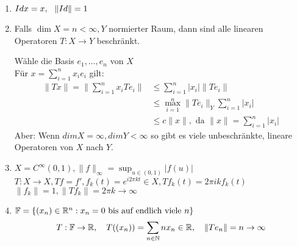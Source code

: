 \begin{beispiel}
	\begin{enumerate}[label=\alph*\upshape)]
		\item $Id x = x, \hspace{0.25cm} \|  Id \| = 1$
		\item Falls $\dim X = n < \infty, Y$ normierter Raum, dann sind alle linearen Operatoren $T: X \rightarrow Y$ beschränkt.
		\begin{beweis}
			Wähle die Basis $e_{1}, \dotsc, e_{n}$ von $X$ \\
			Für $x = \sum_{i = 1}^{n} x_{i} e_{i}$ gilt:
			\begin{align*}
				\| Tx \| = \| \sum_{i = 1}^{n} x_{i} T e_{i} \| & \leq \sum_{i = 1}^{n} | x_{i} | \| T e_{i} \| \\
				& \leq \max_{i = 1}^{n} \| T e_{i} \|_{Y} \sum_{i = 1}^{n} |x_{i}| \\
				& \leq c \| x \|, \text{ da } \| x \| = \sum_{i = 1}^{n} |x_{i} |
			\end{align*}	
			Aber: Wenn $dim X = \infty, dim Y < \infty$ so gibt es viele unbeschränkte, lineare Operatoren von $X$ nach $Y$.
		\end{beweis}
		\item $X = C^{\infty}(0, 1), \| f \|_{\infty} = \sup_{u \in (0, 1)} |f(u)|$ \\
		$T:X \rightarrow X, Tf = f', f_{k}(t) = e^{i 2 \pi k t} \in X, Tf_{k}(t) = 2 \pi i k f_{k}(t)$ \\ 
		$ \| f_{k} \| = 1, \| Tf_{k} \| = 2 \pi k \rightarrow \infty $
		\item $\mathbb{F} = \{ (x_{n}) \in \mathbb{R}^{n}: x_{n} = 0 \text{ bis auf endlich viele } n \}$ \\
			\[ 
			  T: \mathbb{F} \rightarrow \mathbb{R}, \quad T( (x_{n}) ) = \sum_{n \in \mathbb{N}} n x_{n} \in \mathbb{R}, \quad
			 \| T e_{n} \| = n \rightarrow \infty
			\]
	\end{enumerate}	
\end{beispiel}


